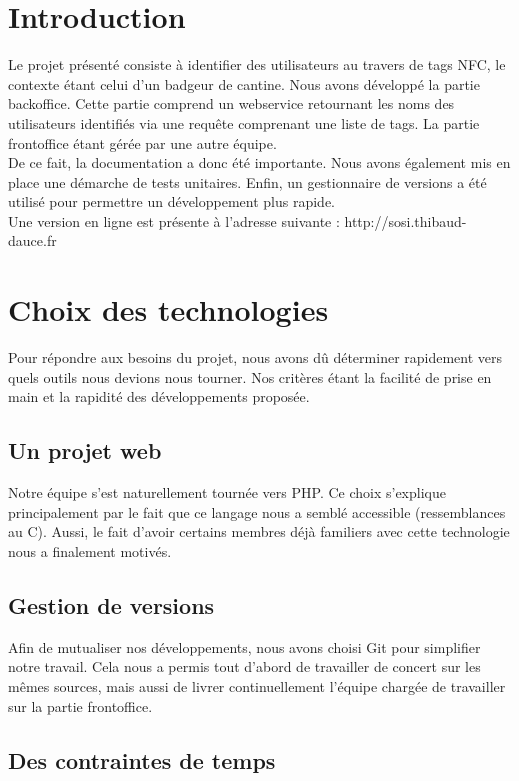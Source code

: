 \chapter*{Introduction}

Le projet présenté consiste à identifier des utilisateurs au travers de tags NFC, le
contexte étant celui d'un badgeur de cantine. Nous avons développé la partie backoffice.
Cette partie comprend un webservice retournant les noms des utilisateurs identifiés via
une requête comprenant une liste de tags. La partie frontoffice étant gérée par une autre équipe.
\\
De ce fait, la documentation a donc été importante. Nous avons également mis en place une démarche de tests unitaires. Enfin, un gestionnaire de versions a été utilisé pour permettre un développement plus rapide.
\\
Une version en ligne est présente à l'adresse suivante : http://sosi.thibaud-dauce.fr

\chapter{Choix des technologies}

Pour répondre aux besoins du projet, nous avons dû déterminer rapidement vers quels outils
nous devions nous tourner. Nos critères étant la facilité de prise en main et la rapidité
des développements proposée.

\section{Un projet web}

Notre équipe s'est naturellement tournée vers PHP. Ce choix s'explique principalement par le fait
que ce langage nous a semblé accessible (ressemblances au C). Aussi, le fait d'avoir certains
membres déjà familiers avec cette technologie nous a finalement motivés.

\section{Gestion de versions}

Afin de mutualiser nos développements, nous avons choisi Git pour simplifier notre
travail. Cela nous a permis tout d'abord de travailler de concert sur les mêmes sources,
mais aussi de livrer continuellement l'équipe chargée de travailler sur la partie frontoffice.

\section{Des contraintes de temps}

